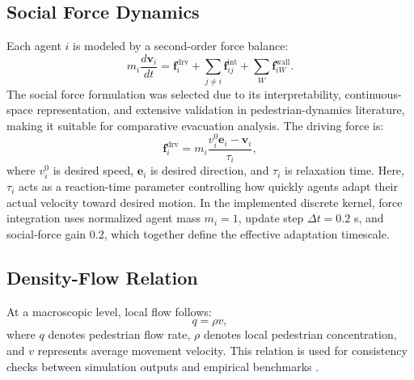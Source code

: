 \documentclass[nolineno]{ieeeaccess}
\begin{document}
\subsection{Social Force Dynamics}
Each agent $i$ is modeled by a second-order force balance:
\begin{equation}
    m_i \frac{d\mathbf{v}_i}{dt} = \mathbf{f}_i^{\mathrm{drv}} + \sum_{j\neq i}\mathbf{f}_{ij}^{\mathrm{int}} + \sum_{W}\mathbf{f}_{iW}^{\mathrm{wall}}.
    \label{eq:sfm_full}
\end{equation}
The social force formulation was selected due to its interpretability, continuous-space representation, and extensive validation in pedestrian-dynamics literature, making it suitable for comparative evacuation analysis.
The driving force is:
\begin{equation}
    \mathbf{f}_i^{\mathrm{drv}} = m_i\frac{v_i^0\mathbf{e}_i-\mathbf{v}_i}{\tau_i},
\end{equation}
where $v_i^0$ is desired speed, $\mathbf{e}_i$ is desired direction, and $\tau_i$ is relaxation time.
Here, $\tau_i$ acts as a reaction-time parameter controlling how quickly agents adapt their actual velocity toward desired motion.
In the implemented discrete kernel, force integration uses normalized agent mass $m_i=1$, update step $\Delta t=0.2$ s, and social-force gain 0.2, which together define the effective adaptation timescale.

\subsection{Density-Flow Relation}
At a macroscopic level, local flow follows:
\begin{equation}
    q = \rho v,
    \label{eq:qrv}
\end{equation}
where $q$ denotes pedestrian flow rate, $\rho$ denotes local pedestrian concentration, and $v$ represents average movement velocity. This relation is used for consistency checks between simulation outputs and empirical benchmarks \cite{fruin,weidmann1993}.
\end{document}
